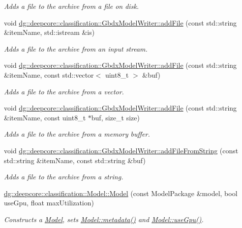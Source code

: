 \begin{DoxyCompactItemize}
\begin{DoxyCompactList}\small\item\em Adds a file to the archive from a file on disk. \end{DoxyCompactList}\item 
void \hyperlink{group___classification_module_ga0f6ad9a470685adc23659eb7a3aa46eb}{dg\+::deepcore\+::classification\+::\+Gbdx\+Model\+Writer\+::add\+File} (const std\+::string \&item\+Name, std\+::istream \&is)
\begin{DoxyCompactList}\small\item\em Adds a file to the archive from an input stream. \end{DoxyCompactList}\item 
void \hyperlink{group___classification_module_gac4840a6a32e802a42f75732b2ec75de8}{dg\+::deepcore\+::classification\+::\+Gbdx\+Model\+Writer\+::add\+File} (const std\+::string \&item\+Name, const std\+::vector$<$ uint8\+\_\+t $>$ \&buf)
\begin{DoxyCompactList}\small\item\em Adds a file to the archive from a vector. \end{DoxyCompactList}\item 
void \hyperlink{group___classification_module_gafbcf569e170e01a25e9a1cc7a114a742}{dg\+::deepcore\+::classification\+::\+Gbdx\+Model\+Writer\+::add\+File} (const std\+::string \&item\+Name, const uint8\+\_\+t $\ast$buf, size\+\_\+t size)
\begin{DoxyCompactList}\small\item\em Adds a file to the archive from a memory buffer. \end{DoxyCompactList}\item 
void \hyperlink{group___classification_module_gaf0cf8086a94f63a55a3dedd710711c3d}{dg\+::deepcore\+::classification\+::\+Gbdx\+Model\+Writer\+::add\+File\+From\+String} (const std\+::string \&item\+Name, const std\+::string \&buf)
\begin{DoxyCompactList}\small\item\em Adds a file to the archive from a string. \end{DoxyCompactList}\item 
\hyperlink{group___classification_module_gac3f95551de3a41eb2bbda756cda5fc07}{dg\+::deepcore\+::classification\+::\+Model\+::\+Model} (const Model\+Package \&model, bool use\+Gpu, float max\+Utilization)
\begin{DoxyCompactList}\small\item\em Constructs a \hyperlink{classdg_1_1deepcore_1_1classification_1_1_model}{Model}, sets \hyperlink{group___classification_module_ga33bdb8fac324a49d0e70175a1440cdd1}{Model\+::metadata()} and \hyperlink{group___classification_module_gaea38e3353458ab22d099d54411d6f868}{Model\+::use\+Gpu()}. \end{DoxyCompactList}\item 

\end{DoxyCompactItemize}
